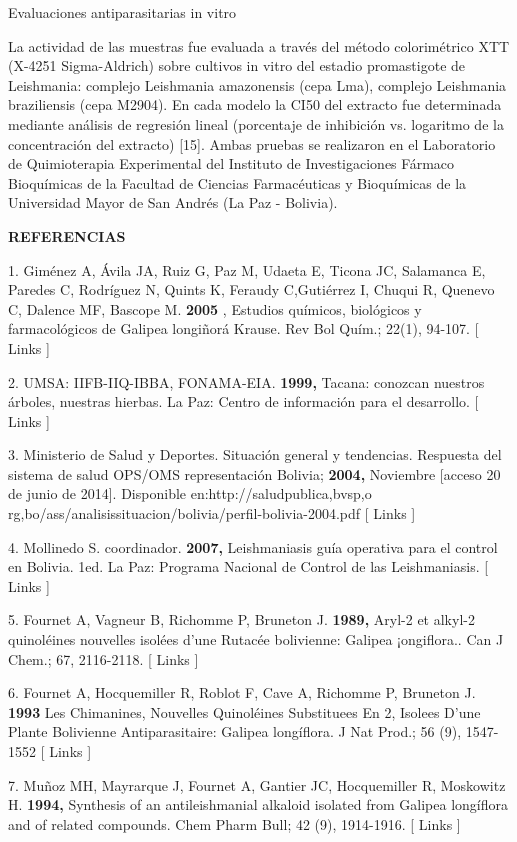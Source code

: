 \documentclass{article}
\begin{document}
Evaluaciones antiparasitarias in vitro

La actividad de las muestras fue evaluada a través del método colorimétrico XTT
(X-4251 Sigma-Aldrich) sobre cultivos in vitro del estadio promastigote de
Leishmania: complejo Leishmania amazonensis (cepa Lma), complejo Leishmania
braziliensis (cepa M2904). En cada modelo la CI50 del extracto fue determinada
mediante análisis de regresión lineal (porcentaje de inhibición vs. logaritmo de
la concentración del extracto) [15]. Ambas pruebas se realizaron en el
Laboratorio de Quimioterapia Experimental del Instituto de Investigaciones
Fármaco Bioquímicas de la Facultad de Ciencias Farmacéuticas y Bioquímicas de la
Universidad Mayor de San Andrés (La Paz - Bolivia).

\textbf{REFERENCIAS}

1. Giménez A, Ávila JA, Ruiz G, Paz M, Udaeta E, Ticona JC, Salamanca E, Paredes
C, Rodríguez N, Quints K, Feraudy C,Gutiérrez I, Chuqui R, Quenevo C, Dalence
MF, Bascope M. \textbf{2005}
, Estudios químicos, biológicos y farmacológicos de Galipea longiñorá Krause.
Rev Bol Quím.; 22(1), 94-107. [ Links ]

2. UMSA: IIFB-IIQ-IBBA, FONAMA-EIA. \textbf{1999, }
Tacana: conozcan nuestros árboles, nuestras hierbas. La Paz: Centro de
información para el desarrollo. [ Links ]

3. Ministerio de Salud y Deportes. Situación general y tendencias. Respuesta del
sistema de salud OPS/OMS representación Bolivia; \textbf{2004, }
Noviembre [acceso 20 de junio de 2014]. Disponible en:http://saludpublica,bvsp,o
rg,bo/ass/analisissituacion/bolivia/perfil-bolivia-2004.pdf [ Links ]

4. Mollinedo S. coordinador. \textbf{2007, }
Leishmaniasis guía operativa para el control en Bolivia. 1ed. La Paz: Programa
Nacional de Control de las Leishmaniasis. [ Links ]

5. Fournet A, Vagneur B, Richomme P, Bruneton J. \textbf{1989, }
Aryl-2 et alkyl-2 quinoléines nouvelles isolées d'une Rutacée bolivienne:
Galipea ¡ongiflora.. Can J Chem.; 67, 2116-2118. [ Links ]

6. Fournet A, Hocquemiller R, Roblot F, Cave A, Richomme P, Bruneton J.
\textbf{1993 }
Les Chimanines, Nouvelles Quinoléines Substituees En 2, Isolees D'une Plante
Bolivienne Antiparasitaire: Galipea longíflora. J Nat Prod.; 56 (9), 1547-1552 [
Links ]

7. Muñoz MH, Mayrarque J, Fournet A, Gantier JC, Hocquemiller R, Moskowitz H.
\textbf{1994, }
Synthesis of an antileishmanial alkaloid isolated from Galipea longíflora and of
related compounds. Chem Pharm Bull; 42 (9), 1914-1916. [ Links ]
\end{document}
